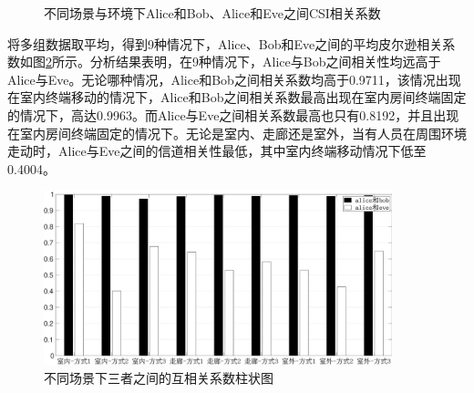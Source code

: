 \documentclass[master]{seuthesis} %
\begin{document}
\begin{Main}
\begin{figure}
{    }
    \quad
    \caption{不同场景与环境下Alice和Bob、Alice和Eve之间CSI相关系数}{} %
    \label{tdd_csi_xcorr}
\end{figure}

将多组数据取平均，得到9种情况下，Alice、Bob和Eve之间的平均皮尔逊相关系数如图\ref{tdd_bar_xcorr}所示。分析结果表明，在9种情况下，Alice与Bob之间相关性均远高于Alice与Eve。无论哪种情况，Alice和Bob之间相关系数均高于0.9711，该情况出现在室内终端移动的情况下，Alice和Bob之间相关系数最高出现在室内房间终端固定的情况下，高达0.9963。而Alice与Eve之间相关系数最高也只有0.8192，并且出现在室内房间终端固定的情况下。无论是室内、走廊还是室外，当有人员在周围环境走动时，Alice与Eve之间的信道相关性最低，其中室内终端移动情况下低至0.4004。

\begin{figure}[htbp!]
    \centering \includegraphics[width=0.9\textwidth]{images/tdd-xcorr/bar2.eps}
    \caption{不同场景下三者之间的互相关系数柱状图}
    \label{tdd_bar_xcorr}
\end{figure}


\end{Main}
\end{document}
